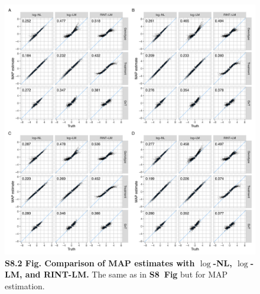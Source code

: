\documentclass[11pt]{article}
\newcommand{\sfigestmcmc}{\textbf{S8~Fig}\xspace}
\begin{document}
\begin{figure}[!ht]
\begin{center}
  \includegraphics[width=1\textwidth]{png/sim_est_map_lap.png}
\end{center}  
\caption{
  {\bf
    S8.2 Fig.
    Comparison of MAP estimates with $\log$-NL, $\log$-LM, and RINT-LM.}
The same as in \sfigestmcmc but for MAP estimation.
}
\label{s-fig:sim-est-map-lap}
\end{figure}
\end{document}
